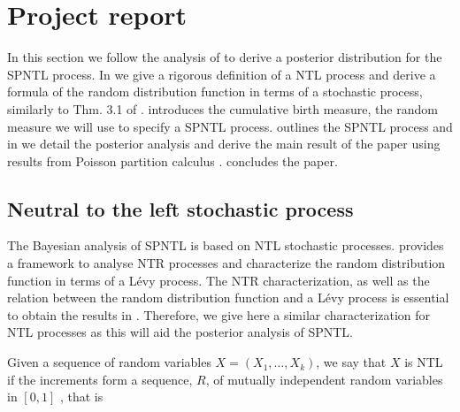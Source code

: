 

\section{Project report}\label{project_report}

In this section we follow the analysis of \cite{james2006poisson} to derive a posterior distribution for the SPNTL process. In  we give a rigorous definition of a NTL process and derive a formula of the random distribution function in terms of a stochastic process, similarly to Thm. 3.1 of \cite{doksum1974tailfree}.  introduces the cumulative birth measure, the random measure we will use to specify a SPNTL process.  outlines the SPNTL process and in  we detail the posterior analysis and derive the main result of the paper using results from Poisson partition calculus \cite{james2005poisson,james2006poisson}.  concludes the paper.

\subsection{Neutral to the left stochastic process}\label{NTL_definition}
The Bayesian analysis of SPNTL is based on NTL stochastic processes. \cite{doksum1974tailfree} provides a framework to analyse NTR processes and characterize the random distribution function in terms of a L{\'e}vy process. The NTR characterization, as well as the relation between the random distribution function and a L{\'e}vy process is essential to obtain the results in \cite{james2006poisson}. Therefore, we give here a similar characterization for NTL processes as this will aid the posterior analysis of SPNTL.

Given a sequence of random variables $X = (X_1, \ldots, X_k)$, we say that $X$ is NTL if the increments form a sequence, $R$, of mutually independent random variables in $[0, 1]$ \cite{bloem2018sampling}, that is

